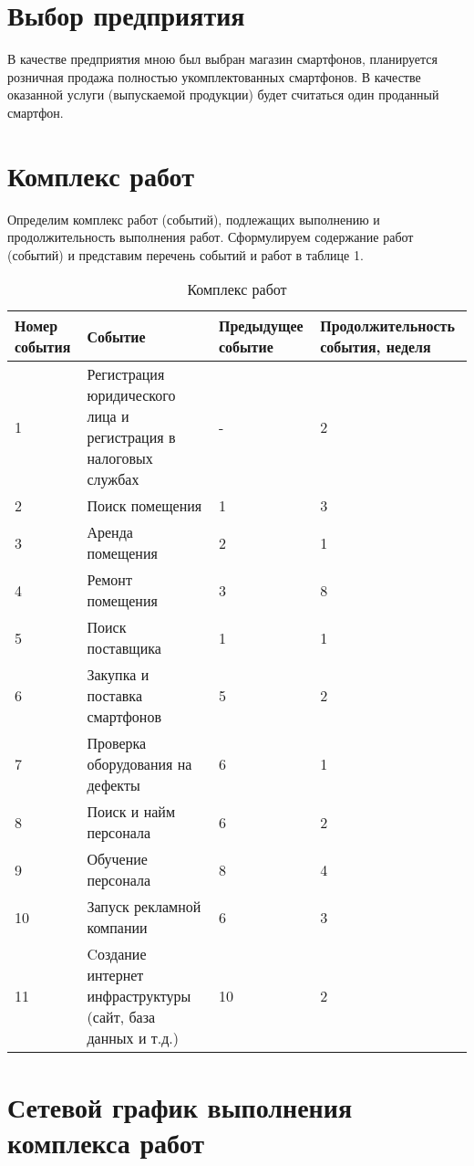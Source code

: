 \section*{Выбор предприятия}
В качестве предприятия мною был выбран магазин смартфонов, планируется розничная продажа полностью укомплектованных смартфонов.
В качестве оказанной услуги (выпускаемой продукции) будет считаться один проданный смартфон.
\newpage
\section*{Комплекс работ}

Определим комплекс работ (событий), подлежащих выполнению и продолжительность выполнения работ. Сформулируем содержание работ (событий) и представим перечень событий и работ в таблице 1.

\begin{table}[h!]
	\caption{Комплекс работ}
	\begin{tabular}{|p{1cm}|p{9cm}|p{3cm}|p{3cm}|}
	\hline
	Номер события & Событие & Предыдущее событие & Продолжительность события, неделя \\
	\hline
	1 & Регистрация юридического
	лица и регистрация в
	налоговых службах
 & - & 2 \\
	\hline
	2 & Поиск помещения & 1 & 3 \\
	\hline
	3 & Аренда помещения & 2 & 1 \\
	\hline
	4 & Ремонт помещения & 3 & 8 \\
	\hline
	5 & Поиск поставщика & 1 & 1 \\
	\hline
	6 & Закупка и поставка смартфонов & 5 & 2 \\
	\hline
	7 & Проверка оборудования на дефекты & 6 & 1 \\
	\hline
	8 & Поиск и найм персонала & 6 & 2 \\
	\hline
	9 & Обучение персонала & 8 & 4 \\
	\hline
	10 & Запуск рекламной компании & 6 & 3 \\
	\hline
	11 & Cоздание интернет инфраструктуры (сайт, база данных и т.д.) & 10 & 2 \\
	\hline

\end{tabular}
\end{table}
\newpage
\section*{Сетевой график выполнения комплекса работ}

